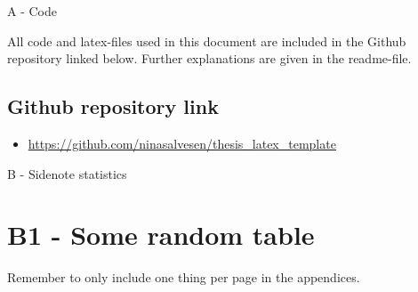
\newpage
{}
\vspace*{2cm}
{\huge A - Code} 
\vspace*{2cm}

\noindent All code and latex-files used in this document are included in the Github repository linked below. Further explanations are given in the readme-file. 


\subsection*{Github repository link}
\begin{itemize}
    \item \url{https://github.com/ninasalvesen/thesis_latex_template}
\end{itemize}





\newpage
{}
\vspace*{2cm}
{\huge B - Sidenote statistics} 
\vspace*{2cm}

\renewcommand{\thefigure}{B.\arabic{figure}}
\setcounter{figure}{0}
\renewcommand{\thetable}{B.\arabic{table}}
\setcounter{table}{0}


\section*{\large{B1 - Some random table}}
\vspace*{1cm}

Remember to only include one thing per page in the appendices.

